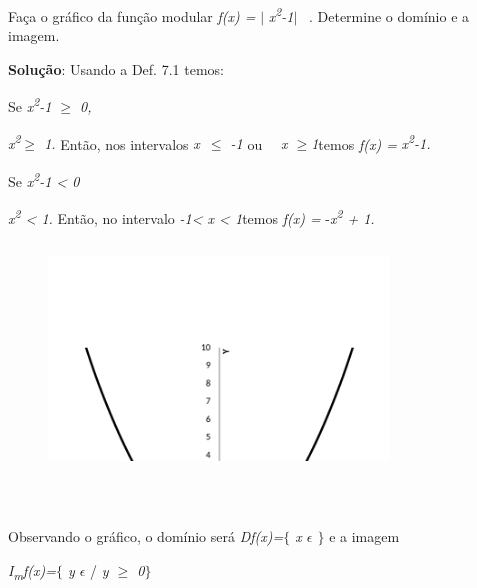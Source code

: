 \begin{texemplo}

Faça o gráfico da função modular \textit{f(x) =} $ \vert $ \textit{x\textsuperscript{2}-1$ \vert $ }~. Determine o domínio e a imagem.  

\textbf{Solução}: Usando a Def. 7.1 temos:

\quad Se \textit{x\textsuperscript{2}-1 $ \geq $  0, }

\quad \textit{x\textsuperscript{2}$ \geq $ 1.  }Então, nos intervalos \textit{ x~$ \leq $ -1   }ou~ \textit{~x $ \geq $1}temos\textit{ f(x) =} \textit{x\textsuperscript{2}-1. }

\quad Se \textit{x\textsuperscript{2}-1 < 0}

\quad \textit{x\textsuperscript{2} < 1.  }Então, no intervalo \textit{-1< x < 1}temos\textit{ f(x) =} -\textit{x\textsuperscript{2 } + 1.}

\begin{figure}[H]
	\begin{Center}
		\includegraphics[width=3.55in,height=2.42in]{capitulos/outras_funcoes/media/image33.pdf}
	\end{Center}
\end{figure}

~~

\quad Observando o gráfico, o domínio será   \textit{Df(x)=$ \{ $ x $ \epsilon $ \textbf{ }$ \} $ } e a imagem

\quad \textit{I\textsubscript{m}f(x)=$ \{ $ y $ \epsilon $  }/ \textit{y $ \geq $  0$ \} $ } \qedsymbol{}
\end{texemplo}

